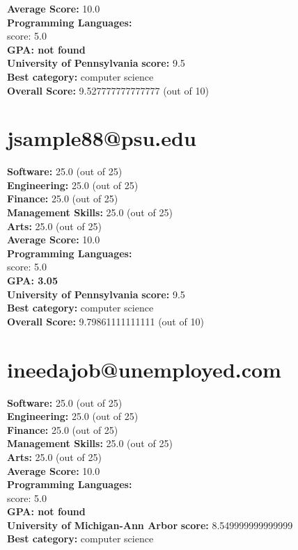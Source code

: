 \documentclass{article}
\begin{document}
\textbf{Average Score: } 10.0\\
\textbf{Programming Languages:} \\
score: 5.0\\
\textbf{GPA: not found}\\
\textbf{University of Pennsylvania} \textbf{score:} 9.5\\
\textbf{Best category: } computer science\\
    \textbf{Overall Score: }9.527777777777777 (out of 10)\section{jsample88@psu.edu}
\textbf{Software:} 25.0 (out of 25)\\
    \textbf{Engineering: } 25.0 (out of 25)\\
    \textbf{Finance:} 25.0 (out of 25)\\
    \textbf{Management Skills:} 25.0 (out of 25)\\
    \textbf{Arts:} 25.0 (out of 25)\\
\textbf{Average Score: } 10.0\\
\textbf{Programming Languages:} \\
score: 5.0\\
\textbf{GPA: 3.05}\\
\textbf{University of Pennsylvania} \textbf{score:} 9.5\\
\textbf{Best category: } computer science\\
    \textbf{Overall Score: }9.79861111111111 (out of 10)\section{ineedajob@unemployed.com}
\textbf{Software:} 25.0 (out of 25)\\
    \textbf{Engineering: } 25.0 (out of 25)\\
    \textbf{Finance:} 25.0 (out of 25)\\
    \textbf{Management Skills:} 25.0 (out of 25)\\
    \textbf{Arts:} 25.0 (out of 25)\\
\textbf{Average Score: } 10.0\\
\textbf{Programming Languages:} \\
score: 5.0\\
\textbf{GPA: not found}\\
\textbf{University of Michigan-Ann Arbor} \textbf{score:} 8.549999999999999\\
\textbf{Best category: } computer science\\
\end{document}
